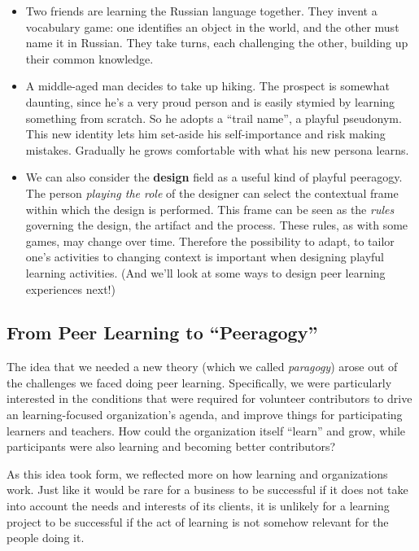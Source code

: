 \begin{itemize}
\item
  Two friends are learning the Russian language together. They invent a
  vocabulary game: one identifies an object in the world, and the other
  must name it in Russian. They take turns, each challenging the other,
  building up their common knowledge.
\item
  A middle-aged man decides to take up hiking. The prospect is somewhat
  daunting, since he's a very proud person and is easily stymied by
  learning something from scratch. So he adopts a ``trail name'', a
  playful pseudonym. This new identity lets him set-aside his
  self-importance and risk making mistakes. Gradually he grows
  comfortable with what his new persona learns.
\item
  We can also consider the \textbf{design} field as a useful kind of
  playful peeragogy. The person \emph{playing the role} of the designer
  can select the contextual frame within which the design is performed.
  This frame can be seen as the \emph{rules} governing the design, the
  artifact and the process. These rules, as with some games, may change
  over time. Therefore the possibility to adapt, to tailor one's
  activities to changing context is important when designing playful
  learning activities. (And we'll look at some ways to design peer
  learning experiences next!)
\end{itemize}

\subsection{From Peer Learning to ``Peeragogy''}

The idea that we needed a new theory (which we called \emph{paragogy})
arose out of the challenges we faced doing peer learning. Specifically,
we were particularly interested in the conditions that were required for
volunteer contributors to drive an learning-focused organization's
agenda, and improve things for participating learners and teachers. How
could the organization itself ``learn'' and grow, while participants
were also learning and becoming better contributors?

As this idea took form, we reflected more on how learning and
organizations work. Just like it would be rare for a business to be
successful if it does not take into account the needs and interests of
its clients, it is unlikely for a learning project to be successful if
the act of learning is not somehow relevant for the people doing it.

